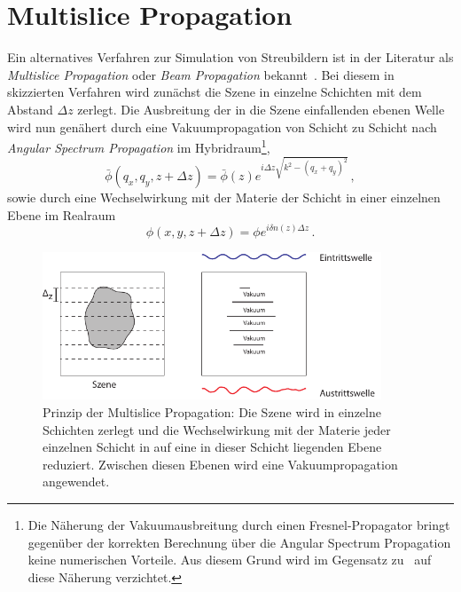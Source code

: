 \section{Multislice Propagation}
Ein alternatives Verfahren zur Simulation von Streubildern ist in der Literatur als \textit{Multislice Propagation} oder \textit{Beam Propagation} bekannt~\cite{hare1994,cowley1957}. Bei diesem in  skizzierten Verfahren wird zunächst die Szene in einzelne Schichten mit dem Abstand $\Delta z$ zerlegt. Die Ausbreitung der in die Szene einfallenden ebenen Welle wird nun genähert durch eine Vakuumpropagation von Schicht zu Schicht nach \textit{Angular Spectrum Propagation} im Hybridraum\footnote{Die Näherung der Vakuumausbreitung durch einen Fresnel-Propagator bringt gegenüber der korrekten Berechnung über die Angular Spectrum Propagation keine numerischen Vorteile. Aus diesem Grund wird im Gegensatz zu~\cite{hare1994} auf diese Näherung verzichtet.},
\begin{equation}
	\bar{\phi}\left(q_x,q_y,z+\Delta z\right)=\bar{\phi}(z)e^{i\Delta z\sqrt{k^2-(q_x+q_y)^2}} \, ,
\end{equation}
sowie durch eine Wechselwirkung mit der Materie der Schicht in einer einzelnen Ebene im Realraum
\begin{equation}
	\phi(x,y,z+\Delta z)=\phi e^{i\delta n\left(z\right) \Delta z} \, .
\end{equation}
\begin{figure}
	\centering
	\includegraphics[width=0.9\textwidth]{images/multislice.pdf}
	\caption[Prinzip Multislice Propagation]{Prinzip der Multislice Propagation: Die Szene wird in einzelne Schichten zerlegt und die Wechselwirkung mit der Materie jeder einzelnen Schicht in auf eine in dieser Schicht liegenden Ebene reduziert. Zwischen diesen Ebenen wird eine Vakuumpropagation angewendet.}
	\label{fig:multislice}
\end{figure} 	


